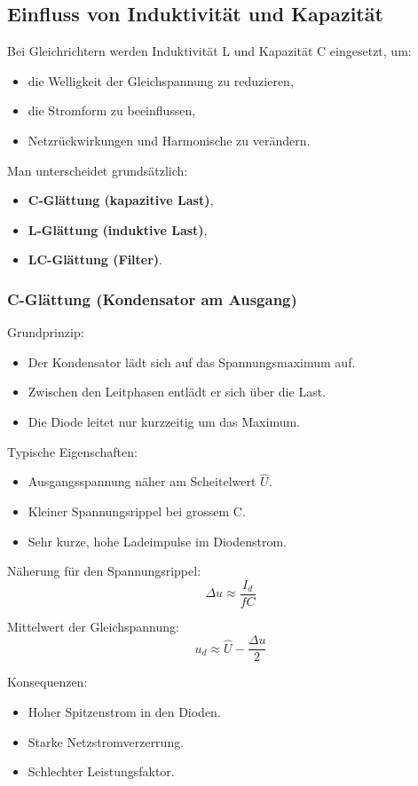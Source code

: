 \subsection{Einfluss von Induktivität und Kapazität}

Bei Gleichrichtern werden Induktivität L und Kapazität C eingesetzt, um:
\begin{itemize}
\item die Welligkeit der Gleichspannung zu reduzieren,
\item die Stromform zu beeinflussen,
\item Netzrückwirkungen und Harmonische zu verändern.
\end{itemize}

Man unterscheidet grundsätzlich:
\begin{itemize}
\item \textbf{C-Glättung (kapazitive Last)},
\item \textbf{L-Glättung (induktive Last)},
\item \textbf{LC-Glättung (Filter)}.
\end{itemize}

\subsubsection{C-Glättung (Kondensator am Ausgang)}

Grundprinzip:
\begin{itemize}
\item Der Kondensator lädt sich auf das Spannungsmaximum auf.
\item Zwischen den Leitphasen entlädt er sich über die Last.
\item Die Diode leitet nur kurzzeitig um das Maximum.
\end{itemize}

Typische Eigenschaften:
\begin{itemize}
\item Ausgangsspannung näher am Scheitelwert $\hat U$.
\item Kleiner Spannungsrippel bei grossem C.
\item Sehr kurze, hohe Ladeimpulse im Diodenstrom.
\end{itemize}

Näherung für den Spannungsrippel:
\[
\boxed{\Delta u \approx \frac{I_d}{f C}}
\]

Mittelwert der Gleichspannung:
\[
\boxed{u_d \approx \hat U - \frac{\Delta u}{2}}
\]

Konsequenzen:
\begin{itemize}
\item Hoher Spitzenstrom in den Dioden.
\item Starke Netzstromverzerrung.
\item Schlechter Leistungsfaktor.
\end{itemize}

